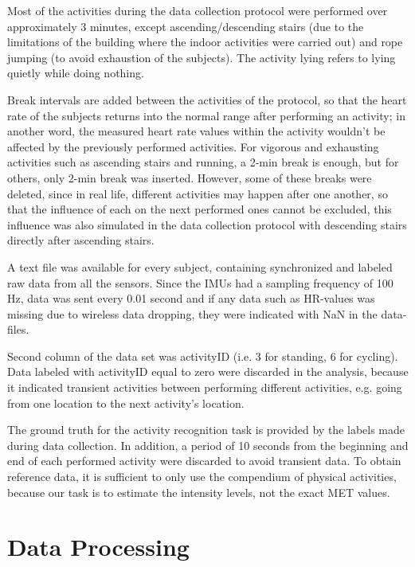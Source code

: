 \documentclass[12pt, a4paper, onecolumn, oneside, parskip=half]{scrartcl}
\begin{document}
Most of the activities during the data collection protocol were performed over approximately 3 minutes, except ascending/descending stairs (due to the limitations of the building where the indoor activities were carried out) and rope jumping (to avoid exhaustion of the subjects). The activity lying refers to lying quietly while doing nothing.

Break intervals are added between the activities of the protocol, so that the heart rate of the subjects returns into the normal range after performing an activity; in another word, the measured heart rate values within the activity wouldn't be affected by the previously performed activities. For vigorous and exhausting activities such as ascending stairs and running, a 2-min break is enough, but for others, only 2-min break was inserted. However, some of these breaks were deleted, since in real life, different activities may happen after one another, so that the influence of each on the next performed ones cannot be excluded, this influence was also simulated in the data collection protocol with descending stairs directly after ascending stairs.

A text file was available for every subject, containing synchronized and labeled raw data from all the sensors. Since the IMUs had a sampling frequency of 100 Hz, data was sent every 0.01 second and if any data such as HR-values was missing due to wireless data dropping, they were indicated with NaN in the data-files.

Second column of the data set was activityID (i.e. 3 for standing, 6 for cycling). Data labeled with activityID equal to zero were discarded in the analysis, because it indicated transient activities between performing different activities, e.g. going from one location to the next activity's location.

The ground truth for the activity recognition task is provided by the labels made during data collection. In addition, a period of 10 seconds from the beginning and end of each performed activity were discarded to avoid transient data. To obtain reference data, it is sufficient to only use the compendium of physical activities, because our task is to estimate the intensity levels, not the exact MET values.



\section{Data Processing }
\end{document}
